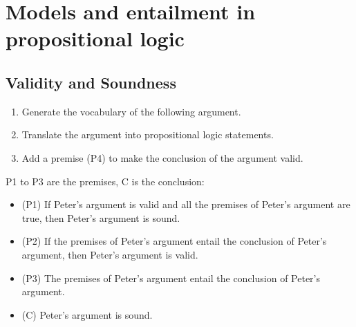\section{Models and entailment in propositional logic}
\subsection{Validity and Soundness}
\begin{large}

\begin{enumerate}[label=(\alph*)]
    \item Generate the vocabulary of the following argument.
    \item Translate the argument into propositional logic statements.
    \item Add a premise (P4) to make the conclusion of the argument valid.
\end{enumerate}
P1 to P3 are the premises, C is the conclusion:
\begin{itemize}
  \item (P1) If Peter’s argument is valid and all the premises of Peter’s argument are true, then Peter’s argument is sound.
  \item (P2) If the premises of Peter’s argument entail the conclusion of Peter’s argument, then Peter’s
argument is valid. 
  \item (P3) The premises of Peter’s argument entail the conclusion of Peter’s argument.
  \item (C) Peter’s argument is sound.
\end{itemize}


\end{large}


